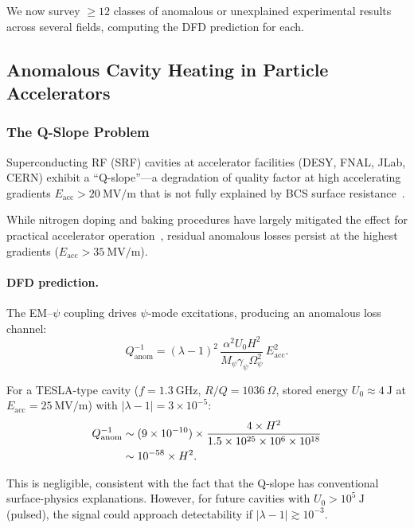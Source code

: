 \documentclass[aps,prd,twocolumn,showpacs,preprintnumbers,superscriptaddress,nofootinbib]{revtex4-2}
\newcommand{\Mpsi}{M_\psi}
\newcommand{\Opsi}{\Omega_\psi}
\begin{document}
We now survey $\geq 12$ classes of anomalous or unexplained experimental
results across several fields, computing the DFD prediction for each.

\subsection{Anomalous Cavity Heating in Particle Accelerators}\label{sec:srf-heating}

\subsubsection{The Q-Slope Problem}

Superconducting RF (SRF) cavities at accelerator facilities (DESY,
FNAL, JLab, CERN) exhibit a ``Q-slope''---a degradation of quality
factor at high accelerating gradients $E_{\mathrm{acc}} > 20~\mathrm{MV/m}$
that is not fully explained by BCS surface resistance~\cite{Grassellino2013,
Padamsee2009,Gurevich2012}.

While nitrogen doping and baking procedures have largely mitigated the
effect for practical accelerator operation~\cite{Grassellino2017},
residual anomalous losses persist at the highest gradients
($E_{\mathrm{acc}} > 35~\mathrm{MV/m}$).

\paragraph{DFD prediction.}
The EM--$\psi$ coupling drives $\psi$-mode excitations, producing an
anomalous loss channel:
\begin{equation}\label{eq:Q-slope-DFD}
Q_{\mathrm{anom}}^{-1} = (\lambda-1)^2\,\frac{\alpha^2 U_0 H^2}{\Mpsi\gamma_\psi\Opsi^2}\,E_{\mathrm{acc}}^2.
\end{equation}

For a TESLA-type cavity ($f = 1.3~\mathrm{GHz}$,
$R/Q = 1036~\Omega$, stored energy $U_0 \approx 4~\mathrm{J}$ at
$E_{\mathrm{acc}} = 25~\mathrm{MV/m}$) with $|\lambda-1| = 3\times 10^{-5}$:
\begin{align}
Q_{\mathrm{anom}}^{-1} &\sim (9\times 10^{-10})\times\frac{4\times H^2}{1.5\times 10^{25}\times 10^6\times 10^{18}} \notag\\
  &\sim 10^{-58}\times H^2.
\end{align}

This is negligible, consistent with the fact that the Q-slope has
conventional surface-physics explanations.  However, for future cavities
with $U_0 > 10^5~\mathrm{J}$ (pulsed), the signal could approach
detectability if $|\lambda-1| \gtrsim 10^{-3}$.
\end{document}
